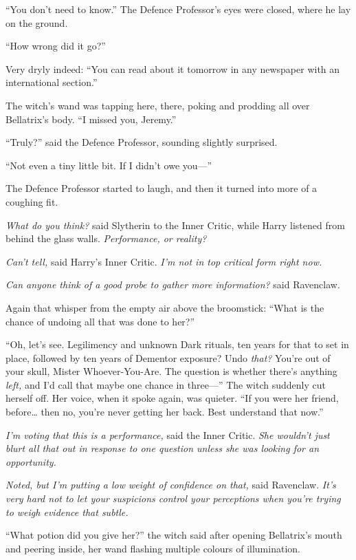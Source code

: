 ``You don't need to know.'' The Defence Professor's eyes were closed,
where he lay on the ground.

``How wrong did it go?''

Very dryly indeed: ``You can read about it tomorrow in any newspaper
with an international section.''

The witch's wand was tapping here, there, poking and prodding all over
Bellatrix's body. ``I missed you, Jeremy.''

``Truly?'' said the Defence Professor, sounding slightly surprised.

``Not even a tiny little bit. If I didn't owe you---''

The Defence Professor started to laugh, and then it turned into more of
a coughing fit.

\emph{What do you think?} said Slytherin to the Inner Critic, while
Harry listened from behind the glass walls. \emph{Performance, or
reality?}

\emph{Can't tell,} said Harry's Inner Critic. \emph{I'm not in top
critical form right now.}

\emph{Can anyone think of a good probe to gather more information?} said
Ravenclaw.

Again that whisper from the empty air above the broomstick: ``What is
the chance of undoing all that was done to her?''

``Oh, let's see. Legilimency and unknown Dark rituals, ten years for
that to set in place, followed by ten years of Dementor exposure? Undo
\emph{that?} You're out of your skull, Mister Whoever-You-Are. The
question is whether there's anything \emph{left,} and I'd call that
maybe one chance in three---'' The witch suddenly cut herself off. Her
voice, when it spoke again, was quieter. ``If you were her friend,
before\ldots{} then no, you're never getting her back. Best understand
that now.''

\emph{I'm voting that this is a performance,} said the Inner Critic.
\emph{She wouldn't just blurt all that out in response to one question
unless she was looking for an opportunity.}

\emph{Noted, but I'm putting a low weight of confidence on that,} said
Ravenclaw. \emph{It's very hard not to let your suspicions control your
perceptions when you're trying to weigh evidence that subtle.}

``What potion did you give her?'' the witch said after opening
Bellatrix's mouth and peering inside, her wand flashing multiple colours
of illumination.

